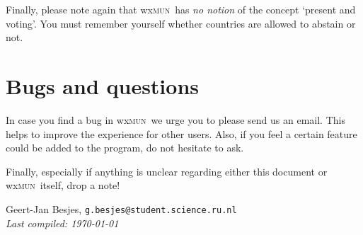 \documentclass[11pt, a4paper]{article}
\newcommand\wxMUN{wx\textsc{mun}}
\begin{document}
Finally, please note again that \wxMUN\ has \emph{no notion} of the concept `present and voting'. You must remember yourself whether countries are allowed to abstain or not.

\section{Bugs and questions}
In case you find a bug in \wxMUN\, we urge you to please send us an email. This helps to improve the experience for other users. Also, if you feel a certain feature could be added to the program, do not hesitate to ask. 

Finally, especially if anything is unclear regarding either this document or \wxMUN\ itself, drop a note!

\vfill
\noindent 
Geert-Jan Besjes, \texttt{g.besjes@student.science.ru.nl} \label{email} \\
\emph{Last compiled: \today}
\end{document}
